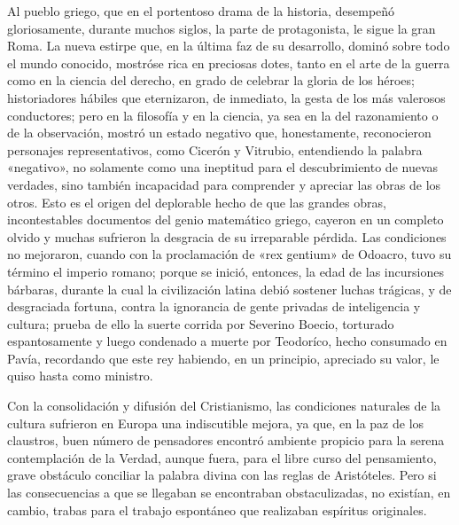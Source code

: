 \documentclass[a4paper, 12pt, draft]{article}
\begin{document}
{Al pueblo griego, que en el portentoso drama de la historia, desempeñó gloriosamente, durante muchos siglos, la parte de protagonista, le sigue la gran Roma. La nueva estirpe que, en la última faz de su desarrollo, dominó sobre todo el mundo conocido, mostróse rica en preciosas dotes, tanto en el arte de la guerra como en la ciencia del derecho, en grado de celebrar la gloria de los héroes; historiadores hábiles que eternizaron, de inmediato, la gesta de los más valerosos conductores; pero en la filosofía y en la ciencia, ya sea en la del razonamiento o de la observación, mostró un estado negativo que, honestamente, reconocieron personajes representativos, como Cicerón y Vitrubio, entendiendo la palabra «negativo», no solamente como una ineptitud para el descubrimiento de nuevas verdades, sino también incapacidad para comprender y apreciar las obras de los otros. Esto es el origen del deplorable hecho de que las grandes obras, incontestables documentos del genio matemático griego, cayeron en un completo olvido y muchas sufrieron
la desgracia de su irreparable pérdida. Las condiciones no mejoraron, cuando con la proclamación de «rex gentium» de Odoacro, tuvo su término el imperio romano; porque se inició, entonces, la edad de las incursiones bárbaras, durante la cual la civilización latina debió sostener luchas trágicas, y de desgraciada fortuna, contra la ignorancia de gente privadas de inteligencia y cultura; prueba de ello la suerte corrida por Severino Boecio, torturado espantosamente y luego condenado a muerte por Teodoríco, hecho consumado en Pavía, recordando que este rey habiendo, en un principio, apreciado su valor, le quiso hasta como ministro.

Con la consolidación y difusión del Cristianismo, las condiciones naturales de la cultura sufrieron en Europa una indiscutible mejora, ya que, en la paz de los claustros, buen número de pensadores encontró ambiente propicio para la serena contemplación de la Verdad, aunque fuera, para el libre curso del pensamiento, grave obstáculo conciliar la palabra divina con las reglas de Aristóteles. Pero si las consecuencias a que se llegaban se encontraban obstaculizadas, no existían, en cambio, trabas para el trabajo espontáneo que realizaban espíritus originales.


}
\end{document}

